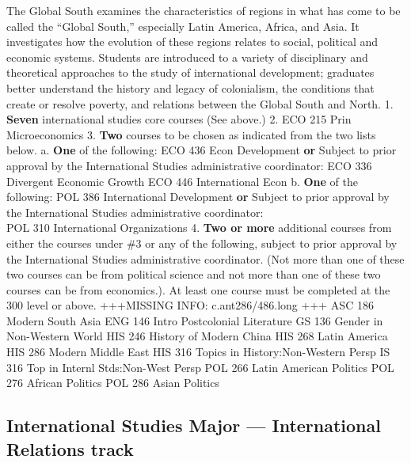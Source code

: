 \documentclass[
  letterpaper,
]{scrbook}
\begin{document}
The Global South examines the characteristics of regions in what has
come to be called the ``Global South,'' especially Latin America,
Africa, and Asia. It investigates how the evolution of these regions
relates to social, political and economic systems. Students are
introduced to a variety of disciplinary and theoretical approaches to
the study of international development; graduates better understand the
history and legacy of colonialism, the conditions that create or resolve
poverty, and relations between the Global South and North. 1.
\textbf{Seven} international studies core courses (See above.) 2. ECO
215 Prin Microeconomics 3. \textbf{Two} courses to be chosen as
indicated from the two lists below. a. \textbf{One} of the following:
ECO 436 Econ Development \textbf{or} Subject to prior approval by the
International Studies administrative coordinator: ECO 336 Divergent
Economic Growth ECO 446 International Econ b. \textbf{One} of the
following: POL 386 International Development \textbf{or} Subject to
prior approval by the International Studies administrative
coordinator:\\
POL 310 International Organizations 4. \textbf{Two or more} additional
courses from either the courses under \#3 or any of the following,
subject to prior approval by the International Studies administrative
coordinator. (Not more than one of these two courses can be from
political science and not more than one of these two courses can be from
economics.). At least one course must be completed at the 300 level or
above. +++MISSING INFO: c.ant286/486.long +++ ASC 186 Modern South Asia
ENG 146 Intro Postcolonial Literature GS 136 Gender in Non-Western World
HIS 246 History of Modern China HIS 268 Latin America HIS 286 Modern
Middle East HIS 316 Topics in History:Non-Western Persp IS 316 Top in
Internl Stds:Non-West Persp POL 266 Latin American Politics POL 276
African Politics POL 286 Asian Politics

\subsection{International Studies Major --- International Relations
track}\label{international-studies-major-international-relations-track}
\end{document}
